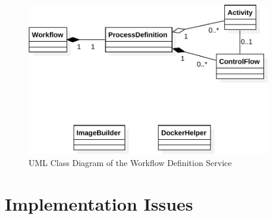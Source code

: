 \begin{figure}[htbp]
  \centering
  \includegraphics[width=0.95\textwidth]{content/images/class_d_definition-crop.pdf}
  \caption{UML Class Diagram of the Workflow Definition Service}
  \label{fig:uml_class_diagram_definition_service}
\end{figure}

\section{Implementation Issues} %
\label{sec:implementation_issues}

